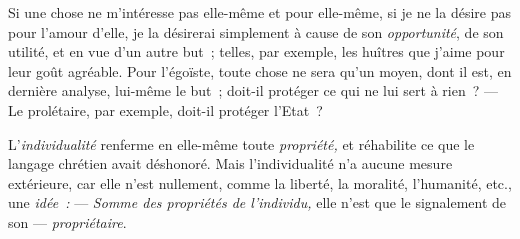 \documentclass[french,twoside]{book} %
\begin{document}
Si une chose ne m’intéresse pas elle-même et pour elle-même, si je ne la désire pas pour l’amour d’elle, je la désirerai simplement à cause de son \emph{opportunité}, de son utilité, et en vue d’un autre but ; telles, par exemple, les huîtres que j’aime pour leur goût agréable. Pour l’égoïste, toute chose ne sera qu’un moyen, dont il est, en dernière analyse, lui-même le but ; doit-il protéger ce qui ne lui sert à rien ? — Le prolétaire, par exemple, doit-il protéger l’Etat ?\par
L’\emph{individualité} renferme en elle-même toute \emph{propriété,} et réhabilite ce que le langage chrétien avait déshonoré. Mais l’individualité n’a aucune mesure extérieure, car elle n’est nullement, comme la liberté, la moralité, l’humanité, etc., une \emph{idée :} — \emph{Somme des propriétés de l’individu,} elle n’est que le signalement de son — \emph{propriétaire}.
\end{document}
